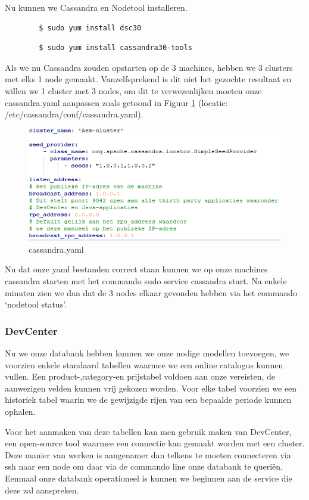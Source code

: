 	\par
	Nu kunnen we Cassandra en Nodetool installeren.
	\begin{lstlisting}
		$ sudo yum install dsc30
	\end{lstlisting}
	\begin{lstlisting}
		$ sudo yum install cassandra30-tools
	\end{lstlisting}
	
	\par
	Als we nu Cassandra zouden opstarten op de 3 machines, hebben we 3 clusters met elks 1 node gemaakt. 
	Vanzelfsprekend is dit niet het gezochte resultaat en willen we 1 cluster met 3 nodes, om dit te verwezenlijken moeten onze cassandra.yaml aanpassen zoals getoond in Figuur \ref{fig:cassandra.yaml} (locatie: /etc/cassandra/conf/cassandra.yaml).
	\begin{figure}[h!]
  		\includegraphics[width=\linewidth]{images/cassandra-yaml.PNG}
  		\caption{cassandra.yaml}
  		\label{fig:cassandra.yaml}
	\end{figure}
	
	\par
	Nu dat onze yaml bestanden correct staan kunnen we op onze machines cassandra starten met het commando \textquotedbl sudo service cassandra start\textquotedbl{}. 
	Na enkele minuten zien we dan dat de 3 nodes elkaar gevonden hebben via het commando ‘nodetool status’.
	
	\par
	\subsubsection{DevCenter}
	 Nu we onze databank hebben kunnen we onze nodige modellen toevoegen, we voorzien enkele standaard tabellen waarmee we een online catalogus kunnen vullen. Een product-,category-en prijstabel voldoen aan onze vereisten, de aanwezigen velden kunnen vrij gekozen worden. Voor elke tabel voorzien we een historiek tabel waarin we de gewijzigde rijen van een bepaalde periode kunnen ophalen.
	 \par
	 Voor het aanmaken van deze tabellen kan men gebruik maken van DevCenter, een open-source tool waarmee een connectie kan gemaakt worden met een cluster. 
	 Deze manier van werken is aangenamer dan telkens te moeten connecteren via ssh naar een node om daar via de commando line onze databank te queri\"en.
	 Eenmaal onze databank operationeel is kunnen we beginnen aan de service die deze zal aanspreken.
